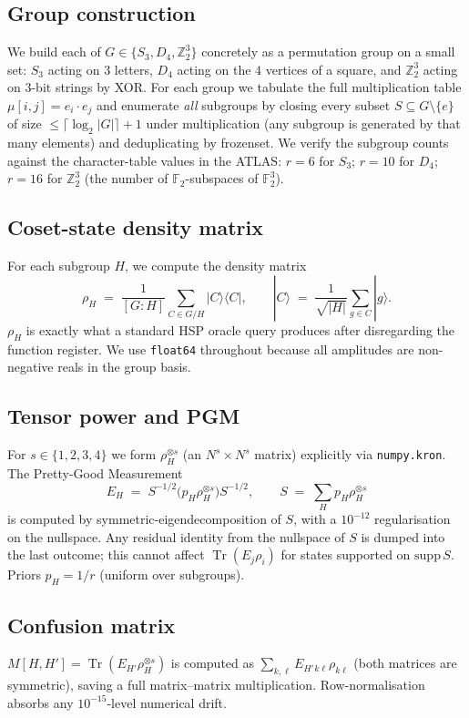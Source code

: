 \documentclass[11pt]{article}
\begin{document}
\subsection{Group construction}
We build each of $G\in\{S_3, D_4, \mathbb{Z}_2^{3}\}$ concretely as a
permutation group on a small set: $S_3$ acting on $3$ letters,
$D_4$ acting on the $4$ vertices of a square, and $\mathbb{Z}_2^{3}$
acting on $3$-bit strings by XOR.  For each group we tabulate the full
multiplication table $\mu[i,j] = e_i\cdot e_j$ and enumerate \emph{all}
subgroups by closing every subset $S\subseteq G\setminus\{e\}$ of size
$\le\lceil\log_2|G|\rceil+1$ under multiplication (any subgroup is generated
by that many elements) and deduplicating by frozenset.  We verify the
subgroup counts against the character-table values in the ATLAS: $r=6$ for
$S_3$; $r=10$ for $D_4$; $r=16$ for $\mathbb{Z}_2^{3}$ (the number of
$\mathbb{F}_2$-subspaces of $\mathbb{F}_2^{3}$).

\subsection{Coset-state density matrix}
For each subgroup $H$, we compute the density matrix
\[
  \rho_H \;=\; \frac{1}{[G:H]} \sum_{C \in G/H} |C\rangle\!\langle C|,
  \qquad
  |C\rangle \;=\; \frac{1}{\sqrt{|H|}} \sum_{g\in C} |g\rangle .
\]
$\rho_H$ is exactly what a standard HSP oracle query produces after
disregarding the function register.  We use \texttt{float64} throughout
because all amplitudes are non-negative reals in the group basis.

\subsection{Tensor power and PGM}
For $s\in\{1,2,3,4\}$ we form $\rho_H^{\otimes s}$ (an $N^s\times N^s$
matrix) explicitly via \texttt{numpy.kron}.  The Pretty-Good Measurement
\[
  E_H \;=\; S^{-1/2}\bigl(p_H \rho_H^{\otimes s}\bigr) S^{-1/2},
  \qquad
  S \;=\; \sum_H p_H \rho_H^{\otimes s}
\]
is computed by symmetric-eigendecomposition of $S$, with a $10^{-12}$
regularisation on the nullspace.  Any residual identity from the nullspace
of $S$ is dumped into the last outcome; this cannot affect
$\operatorname{Tr}(E_j\rho_i)$ for states supported on
$\mathrm{supp}\,S$.  Priors $p_H = 1/r$ (uniform over subgroups).

\subsection{Confusion matrix}
$M[H,H'] = \operatorname{Tr}(E_{H'} \rho_H^{\otimes s})$ is computed as
$\sum_{k,\ell} E_{H'}{}_{k\ell} \rho_{k\ell}$ (both matrices are symmetric),
saving a full matrix--matrix multiplication.  Row-normalisation absorbs any
$10^{-15}$-level numerical drift.
\end{document}
